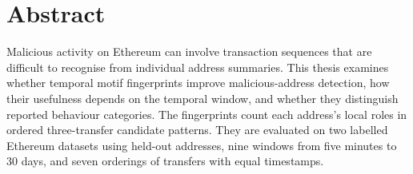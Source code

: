 \documentclass{thesisclass}
\begin{document}
\frontmatter
{}



{}
\clearpage
\tableofcontents


{
\clearpage
{} %
\listoffigures
\clearpage
{} %
\listoftables
}
{
\clearpage
{} %
\listoffigures
\clearpage
{} %
\listoftables
}








\mainmatter
{}


\chapter*{Abstract}
{}
Malicious activity on Ethereum can involve transaction sequences that are
difficult to recognise from individual address summaries. This thesis examines
whether temporal motif fingerprints improve malicious-address detection, how
their usefulness depends on the temporal window, and whether they distinguish
reported behaviour categories. The fingerprints count each address's local
roles in ordered three-transfer candidate patterns. They are evaluated on two
labelled Ethereum datasets using held-out addresses, nine windows from five
minutes to 30 days, and seven orderings of transfers with equal timestamps.
\end{document}
